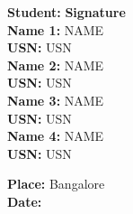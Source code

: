 \documentclass[ 12pt,a4paper,twocolumn,fleqn]{report}
\begin{document}
\noindent
\begin{minipage}{0.8\textwidth}
    \textbf{Student:} \hfill\textbf{Signature}\\
    
    \textbf{Name 1:} NAME\\ \textbf{USN:} USN \\
    
    \textbf{Name 2:} NAME \\ \textbf{USN:} USN \\
    
    \textbf{Name 3:} NAME \\ \textbf{USN:} USN \\
    
    \textbf{Name 4:} NAME \\ \textbf{USN:} USN \\

\end{minipage}

\begin{flushleft}
    \textbf{Place:} Bangalore \\
    \textbf{Date:} 
\end{flushleft}
\end{document}
